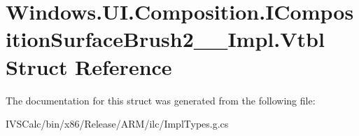 \hypertarget{struct_windows_1_1_u_i_1_1_composition_1_1_i_composition_surface_brush2_____impl_1_1_vtbl}{}\section{Windows.\+U\+I.\+Composition.\+I\+Composition\+Surface\+Brush2\+\_\+\+\_\+\+Impl.\+Vtbl Struct Reference}
\label{struct_windows_1_1_u_i_1_1_composition_1_1_i_composition_surface_brush2_____impl_1_1_vtbl}


The documentation for this struct was generated from the following file\+:\begin{DoxyCompactItemize}
\item 
I\+V\+S\+Calc/bin/x86/\+Release/\+A\+R\+M/ilc/Impl\+Types.\+g.\+cs\end{DoxyCompactItemize}
